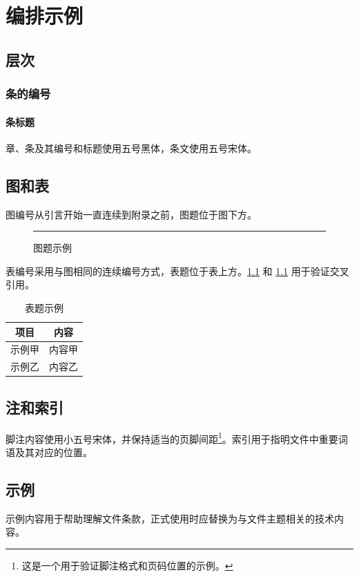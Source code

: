 \chapter{编排示例}
\section{层次}
\subsection{条的编号}
\subsubsection{条标题}
章、条及其编号和标题使用五号黑体，条文使用五号宋体。

\section{图和表}
图编号从引言开始一直连续到附录之前，图题位于图下方。

\begin{figure}[htb]
    \centering
    \rule{4cm}{3cm}
    \caption{图题示例}
    \label{fig:example}
\end{figure}

表编号采用与图相同的连续编号方式，表题位于表上方。\ref{fig:example} 和 \ref{tab:example} 用于验证交叉引用。

\begin{table}[htb]
    \centering
    \caption{表题示例}
    \label{tab:example}
    \begin{tabular}{|c|c|}
        \hline
        项目 & 内容 \\
        \hline
        示例甲 & 内容甲 \\
        示例乙 & 内容乙 \\
        \hline
    \end{tabular}
\end{table}

\section{注和索引}
脚注内容使用小五号宋体，并保持适当的页脚间距\footnote{这是一个用于验证脚注格式和页码位置的示例。}。索引用于指明文件中重要词语及其对应的位置。

\section{示例}
示例内容用于帮助理解文件条款，正式使用时应替换为与文件主题相关的技术内容。
